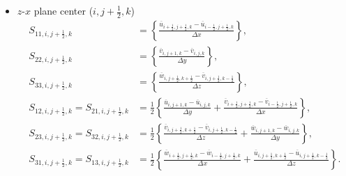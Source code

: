 \begin{itemize}
  \item $z$-$x$ plane center ($i,j+\frac{1}{2},k$)
    \begin{align}
      S_{11,i,j+\frac{1}{2},k} &= \left\{
      \frac{\overline{u}_{i+\frac{1}{2},j+\frac{1}{2},k}-\overline{u}_{i-\frac{1}{2},j+\frac{1}{2},k}}{\Delta x}
      \right\}, \\
      S_{22,i,j+\frac{1}{2},k} &= \left\{
      \frac{\overline{v}_{i,j+1,k}-\overline{v}_{i,j,k}}{\Delta y}
      \right\}, \\
      S_{33,i,j+\frac{1}{2},k} &= \left\{
      \frac{\overline{w}_{i,j+\frac{1}{2},k+\frac{1}{2}}-\overline{v}_{i,j+\frac{1}{2},k-\frac{1}{2}}}{\Delta z}
      \right\}, \\
      S_{12,i,j+\frac{1}{2},k} = S_{21,i,j+\frac{1}{2},k} &= \frac{1}{2}\left\{
      \frac{\overline{u}_{i,j+1,k}-\overline{u}_{i,j,k}}{\Delta y}
     +\frac{\overline{v}_{i+\frac{1}{2},j+\frac{1}{2},k}-\overline{v}_{i-\frac{1}{2},j+\frac{1}{2},k}}{\Delta x}
      \right\}, \\
      S_{23,i,j+\frac{1}{2},k} = S_{32,i,j+\frac{1}{2},k} &= \frac{1}{2}\left\{
      \frac{\overline{v}_{i,j+\frac{1}{2},k+\frac{1}{2}}-\overline{v}_{i,j+\frac{1}{2},k-\frac{1}{2}}}{\Delta z}
     +\frac{\overline{w}_{i,j+1,k}-\overline{w}_{i,j,k}}{\Delta y}
      \right\}, \\
      S_{31,i,j+\frac{1}{2},k} = S_{13,i,j+\frac{1}{2},k} &= \frac{1}{2}\left\{
      \frac{\overline{w}_{i+\frac{1}{2},j+\frac{1}{2},k}-\overline{w}_{i-\frac{1}{2},j+\frac{1}{2},k}}{\Delta x}
     +\frac{\overline{u}_{i,j+\frac{1}{2},k+\frac{1}{2}}-\overline{u}_{i,j+\frac{1}{2},k-\frac{1}{2}}}{\Delta z}
      \right\}.
    \end{align}


\end{itemize}
